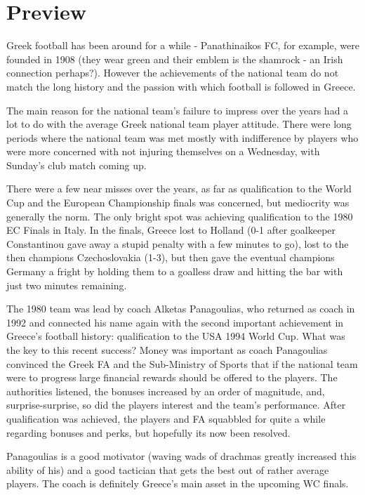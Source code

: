 \section{Preview}
Greek football has been around for a while - Panathinaikos FC, for example, 
were founded in 1908 (they wear green and their emblem is the shamrock - an 
Irish connection perhaps?). However the achievements of the national team do 
not match the long history and the passion with which football is followed in 
Greece.

The main reason for the national team's failure to impress over the years had a
lot to do with the average Greek national team player attitude. There were long
periods where the national team was met mostly with indifference by players 
who were more concerned with not injuring themselves on a Wednesday, with 
Sunday's club match coming up.

There were a few near misses over the years, as far as qualification to the 
World Cup and the European Championship finals was concerned, but mediocrity 
was generally the norm. The only bright spot was achieving qualification to the
1980 EC Finals in Italy. In the finals, Greece lost to Holland (0-1 after 
goalkeeper Constantinou gave away a stupid penalty with a few minutes to go), 
lost to the then champions Czechoslovakia (1-3), but then gave the eventual 
champions Germany a fright by holding them to a goalless draw and hitting the 
bar with just two minutes remaining.

The 1980 team was lead by coach Alketas Panagoulias, who returned as coach in
1992 and connected his name again with the second important achievement in 
Greece's football history: qualification to the USA 1994 World Cup. What was 
the key to this recent success? Money was important as coach Panagoulias 
convinced the Greek FA and the Sub-Ministry of Sports that if the national 
team were to progress large financial rewards should be offered to the players.
The authorities listened, the bonuses increased by an order of magnitude, and,
surprise-surprise, so did the players interest and the team's performance. 
After qualification was achieved, the players and FA squabbled for quite a 
while regarding bonuses and perks, but hopefully its now been resolved.

Panagoulias is a good motivator (waving wads of drachmas greatly increased 
this ability of his) and a good tactician that gets the best out of rather 
average players. The coach is definitely Greece's main asset in the upcoming 
WC finals.
